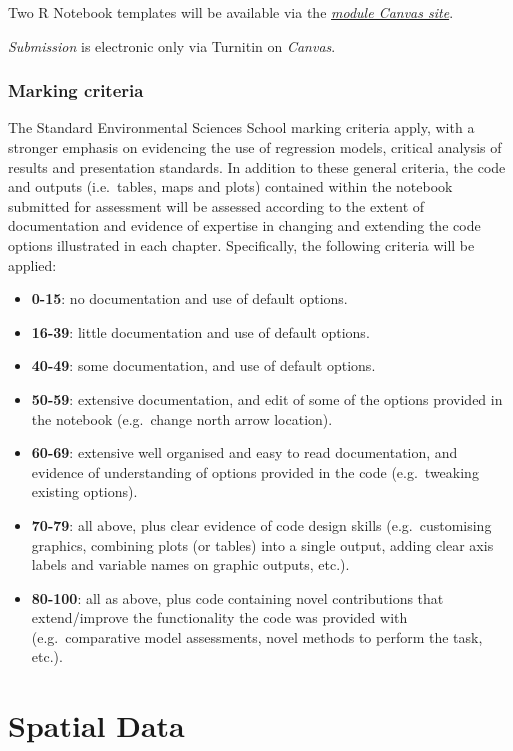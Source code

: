 \documentclass[
  letterpaper,
  krantz2]{style/krantz}
\providecommand{\tightlist}{%
  \setlength{\itemsep}{0pt}\setlength{\parskip}{0pt}}\usepackage{longtable,booktabs,array}
\begin{document}
Two R Notebook templates will be available via the
\href{https://liverpool.instructure.com}{\emph{module Canvas site}}.

\emph{Submission} is electronic only via Turnitin on \emph{Canvas}.

\hypertarget{marking-criteria}{%
\subsection{Marking criteria}\label{marking-criteria}}

The Standard Environmental Sciences School marking criteria apply, with
a stronger emphasis on evidencing the use of regression models, critical
analysis of results and presentation standards. In addition to these
general criteria, the code and outputs (i.e.~tables, maps and plots)
contained within the notebook submitted for assessment will be assessed
according to the extent of documentation and evidence of expertise in
changing and extending the code options illustrated in each chapter.
Specifically, the following criteria will be applied:

\begin{itemize}
\tightlist
\item
  \textbf{0-15}: no documentation and use of default options.
\item
  \textbf{16-39}: little documentation and use of default options.
\item
  \textbf{40-49}: some documentation, and use of default options.
\item
  \textbf{50-59}: extensive documentation, and edit of some of the
  options provided in the notebook (e.g.~change north arrow location).
\item
  \textbf{60-69}: extensive well organised and easy to read
  documentation, and evidence of understanding of options provided in
  the code (e.g.~tweaking existing options).
\item
  \textbf{70-79}: all above, plus clear evidence of code design skills
  (e.g.~customising graphics, combining plots (or tables) into a single
  output, adding clear axis labels and variable names on graphic
  outputs, etc.).
\item
  \textbf{80-100}: all as above, plus code containing novel
  contributions that extend/improve the functionality the code was
  provided with (e.g.~comparative model assessments, novel methods to
  perform the task, etc.).
\end{itemize}

\hypertarget{spatial_data}{%
\chapter{Spatial Data}\label{spatial_data}}
\end{document}

